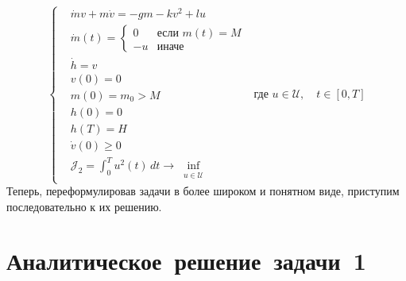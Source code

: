 \documentclass[11pt, oneside, final]{article}
\theoremstyle{break}
\numberwithin{equation}{section}
\theoremstyle{plain}
\theoremstyle{definition}
\begin{document}
    \begin{equation}
        \label{eq:task2}
        \left\{
        \begin{aligned}
            &\dot mv + m \dot v = -gm - kv^2 + lu \\
            &\dot m(t) = \begin{cases} 0& \text{если $m(t) = M$} \\ 
                                 -u& \text{иначе}
                     \end{cases} \\
            &\dot h = v\\
            &v(0) = 0 \\
            &m(0) = m_0 > M \\
            &h(0) = 0 \\
            &h(T) = H \\
            &\dot v(0) \geqslant 0 \\
            &\mathcal{J}_2 = \int_0^T{u^2(t)\,dt} \rightarrow \inf_{\substack{u \in \mathcal{U}}}
        \end{aligned}
        \right.
        \text{ где }u \in \mathcal{U},\quad t \in [0, T]
    \end{equation}
    Теперь, переформулировав задачи в более широком и понятном виде, приступим последовательно к их решению.
    \section{Аналитическое~решение~задачи~1}
    \label{sec:task1}
\end{document}
